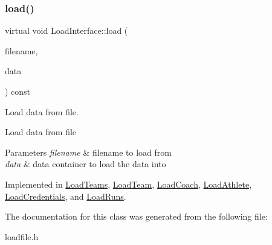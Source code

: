 \subsubsection{\texorpdfstring{load()}{load()}}
{\footnotesize\ttfamily virtual void Load\+Interface\+::load (\begin{DoxyParamCaption}\item[{std\+::string}]{filename,  }\item[{\mbox{\hyperlink{classFileDataContainer}{File\+Data\+Container}} $\ast$}]{data }\end{DoxyParamCaption}) const\hspace{0.3cm}{\ttfamily [pure virtual]}}



Load data from file. 

Load data from file 
\begin{DoxyParams}{Parameters}
{\em filename} & filename to load from \\
\hline
{\em data} & data container to load the data into \\
\hline
\end{DoxyParams}


Implemented in \mbox{\hyperlink{classLoadTeams_afbd12f0d1b9630e0e4260979a4a78d6c}{Load\+Teams}}, \mbox{\hyperlink{classLoadTeam_ab91ac047be89f44e5011abca678fb077}{Load\+Team}}, \mbox{\hyperlink{classLoadCoach_a53429bab741a1570b91f1650437b7af2}{Load\+Coach}}, \mbox{\hyperlink{classLoadAthlete_a27b179d1707fe253ae506a97b112eac0}{Load\+Athlete}}, \mbox{\hyperlink{classLoadCredentials_ac2501d106f98bc7b7939f2d153de9707}{Load\+Credentials}}, and \mbox{\hyperlink{classLoadRuns_ad02c65a93f4be99d420ad04a8eeb1a3c}{Load\+Runs}}.



The documentation for this class was generated from the following file\+:\begin{DoxyCompactItemize}
\item 
loadfile.\+h\end{DoxyCompactItemize}
